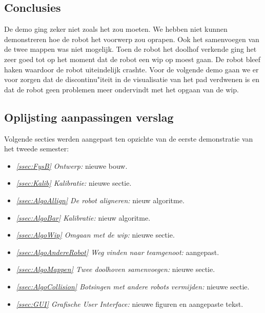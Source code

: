 \documentclass[tt3]{penoverslag}
\begin{document}
\subsection{Conclusies}
\label{Assec:conc2}
De demo ging zeker niet zoals het zou moeten. We hebben niet kunnen demonstreren hoe de robot het voorwerp zou oprapen. Ook het samenvoegen van de twee mappen was niet mogelijk. Toen de robot het doolhof verkende ging het zeer goed tot op het moment dat de robot een wip op moest gaan. De robot bleef haken waardoor de robot uiteindelijk crashte. Voor de volgende demo gaan we er voor zorgen dat de discontinu"iteit in de visualisatie van het pad verdwenen is en dat de robot geen problemen meer ondervindt met het opgaan van de wip.


\subsection{Oplijsting aanpassingen verslag}
\label{Assec:aanp2}
Volgende secties werden aangepast ten opzichte van de eerste demonstratie van het tweede semester:

\begin{itemize}
\item \textit{\ref{ssec:FysB} Ontwerp:} nieuwe bouw.
\item \textit{\ref{ssec:Kalib} Kalibratie:} nieuwe sectie.
\item \textit{\ref{ssec:AlgoAllign} De robot aligneren:} nieuw algoritme.
\item \textit{\ref{ssec:AlgoBar} Kalibratie:} nieuw algoritme.
\item \textit{\ref{ssec:AlgoWip} Omgaan met de wip:} nieuwe sectie.
\item \textit{\ref{ssec:AlgoAndereRobot} Weg vinden naar teamgenoot:} aangepast.
\item \textit{\ref{ssec:AlgoMappen} Twee doolhoven samenvoegen:} nieuwe sectie.
\item \textit{\ref{ssec:AlgoCollision} Botsingen met andere robots vermijden:} nieuwe sectie.
\item \textit{\ref{ssec:GUI} Grafische User Interface:} nieuwe figuren en aangepaste tekst.

\end{itemize}
\end{document}
